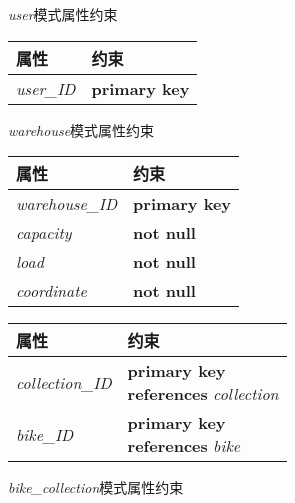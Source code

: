\begin{figure}[!htp]
    \begin{minipage}{0.3\textwidth}
      \centering
      \caption{\textit{user}模式属性约束}
      \label{tab:constraintuser}
      \begin{tabular}{ll}\toprule
        属性&约束\\\midrule
       \textit{user\_ID}&\textbf{primary key}\\
       \bottomrule
      \end{tabular}
    \end{minipage}\hfill
    \begin{minipage}{0.3\textwidth}
      \centering
      \caption{\textit{warehouse}模式属性约束}
      \label{tab:constraintwarehouse}
      \begin{tabular}{ll}\toprule
        属性&约束\\\midrule
       \textit{warehouse\_ID}&\textbf{primary key}\\
       \textit{capacity}&\textbf{not null}\\
       \textit{load}&\textbf{not null}\\
       \textit{coordinate}&\textbf{not null}\\
       \bottomrule
      \end{tabular}
    \end{minipage}\hfill
    \begin{minipage}{0.3\textwidth}
      \centering
      \caption{\textit{bike\_collection}模式属性约束}
      \label{tab:cbikecollection}
      \begin{tabular}{ll}\toprule
        属性&约束\\\midrule
       \textit{collection\_ID}&\makecell[l]{\textbf{primary key}\\\textbf{references} \textit{collection}}\\
       \textit{bike\_ID}&\makecell[l]{\textbf{primary key}\\\textbf{references} \textit{bike}}\\
       \bottomrule
      \end{tabular}
    \end{minipage}\hfill
 \end{figure}
